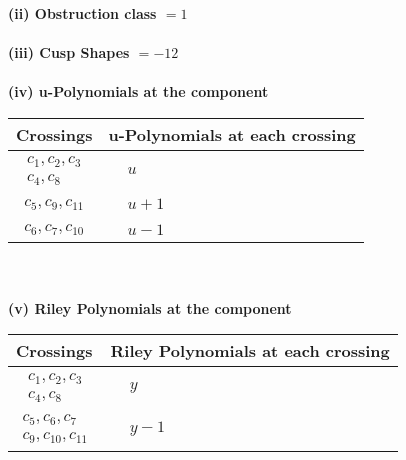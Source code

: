 \documentclass[1p]{elsarticle_modified}
\theoremstyle{definition}
\begin{document}
\flushleft \textbf{(ii) Obstruction class $= 1$}\\~\\
\flushleft \textbf{(iii) Cusp Shapes $= -12$}\\~\\
\newpage\renewcommand{\arraystretch}{1}
\flushleft \textbf{(iv) u-Polynomials at the component}\newline \\
\begin{tabular}{m{50pt}|m{274pt}}
Crossings & \hspace{64pt}u-Polynomials at each crossing \\
\hline $$\begin{aligned}c_{1},c_{2},c_{3}\\c_{4},c_{8}\end{aligned}$$&$\begin{aligned}
&u
\end{aligned}$\\
\hline $$\begin{aligned}c_{5},c_{9},c_{11}\end{aligned}$$&$\begin{aligned}
&u+1
\end{aligned}$\\
\hline $$\begin{aligned}c_{6},c_{7},c_{10}\end{aligned}$$&$\begin{aligned}
&u-1
\end{aligned}$\\
\hline
\end{tabular}\\~\\
\newpage\renewcommand{\arraystretch}{1}
\flushleft \textbf{(v) Riley Polynomials at the component}\newline \\
\begin{tabular}{m{50pt}|m{274pt}}
Crossings & \hspace{64pt}Riley Polynomials at each crossing \\
\hline $$\begin{aligned}c_{1},c_{2},c_{3}\\c_{4},c_{8}\end{aligned}$$&$\begin{aligned}
&y
\end{aligned}$\\
\hline $$\begin{aligned}c_{5},c_{6},c_{7}\\c_{9},c_{10},c_{11}\end{aligned}$$&$\begin{aligned}
&y-1
\end{aligned}$\\
\hline
\end{tabular}\\~\\
\end{document}
